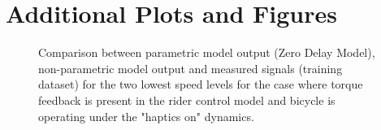 \chapter{Additional Plots and Figures}\label{ch:appD}


\begin{figure}[!h]
    \centering
    \begin{subfigure}[b]{\textwidth}
        \centering
        \caption{}
        \label{fig:zdm_fit1}
    \end{subfigure}
    \begin{subfigure}[b]{\textwidth}
        \centering
        \caption{}
        \label{fig:zdm_fit2}
    \end{subfigure}
    
    \caption{Comparison between parametric model output (Zero Delay Model), non-parametric model output and measured signals (training dataset) for the two lowest speed levels for the case where torque feedback is present in the rider control model and bicycle is operating under the "haptics on" dynamics.}
    \label{fig:zdm_fitA}
 \end{figure}

